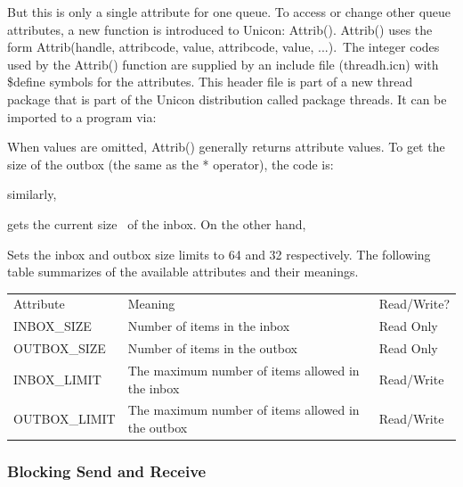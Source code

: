 
But this is only a single attribute for one queue. To access or change
other queue attributes, a new function is introduced to Unicon:
\textsf{Attrib()}. \textsf{Attrib()}
uses the form \textsf{Attrib(handle, attribcode, value,
attribcode, value, ...)}.~The integer codes used by the
\textsf{Attrib()} function are supplied by an include
file (\textsf{threadh.icn}) with
\textsf{\$define} symbols for the attributes. This
header file is part of a new thread package that is part of the Unicon
distribution called package \textsf{threads}. It can be
imported to a program via:


When values are omitted, \textsf{Attrib()} generally
returns attribute values. To get the size of the outbox (the same as
the * operator), the code is:


\noindent similarly, 


gets the current size \ of the inbox. On the other hand, 


Sets the inbox and outbox size limits to 64 and 32 respectively. The
following table summarizes of the available attributes and their
meanings.


\bigskip

\begin{flushleft}
\tablehead{}
\begin{supertabular}{m{2.0941598in}m{1.9087598in}m{1.9108598in}}
Attribute &
Meaning &
Read/Write?\\
INBOX\_SIZE &
Number of items in the inbox &
Read Only\\
OUTBOX\_SIZE &
Number of items in the outbox &
Read Only\\
INBOX\_LIMIT &
The maximum number of items allowed in the inbox &
Read/Write\\
OUTBOX\_LIMIT &
The maximum number of items allowed in the outbox &
Read/Write\\
\end{supertabular}
\end{flushleft}

\bigskip


\bigskip

\subsubsection{Blocking Send and Receive}

